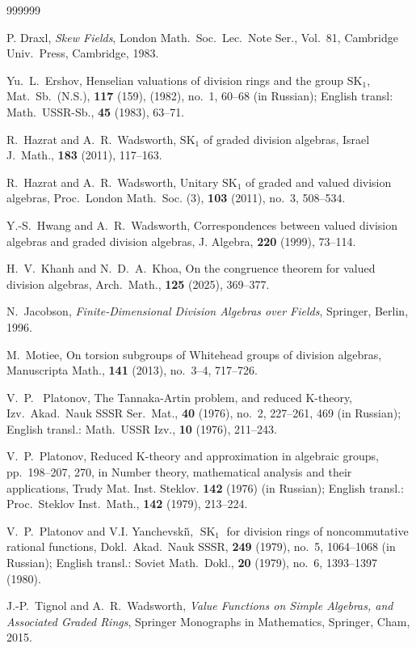 \documentclass[11pt]{article}
\numberwithin{equation}{section}
\theoremstyle{plain}
\theoremstyle{remark}
\newcommand{\opn}{\operatorname}
\newcommand{\SK}{\opn{SK_1}}
\begin{document}
\begin{thebibliography}{999999}

 P. Draxl, {\it{Skew Fields}}, London Math.~Soc.~Lec.~Note Ser., Vol.~81, 
Cambridge Univ.~Press, Cambridge, 1983.

 Yu.~L.~Ershov, Henselian valuations of division rings and the group $\SK$,
Mat.~Sb.~(N.S.), \textbf{117} (159),  (1982), no.~1, 60--68 (in Russian); English transl: Math.~USSR-Sb., 
\textbf{45} (1983), 63--71.


R.~Hazrat and A.~R.~Wadsworth, $\mathrm{SK}_1$ of graded division algebras, Israel J.~Math., \textbf{183} (2011), 117--163.

R.~Hazrat and A.~R.~Wadsworth, 
Unitary $\mathrm{SK}_1$ of graded and valued division algebras, 
Proc.~London Math.~Soc. (3), \textbf{103} (2011), no.~3, 508--534.

Y.-S.~Hwang and A.~R.~Wadsworth, Correspondences between valued division algebras and graded division algebras, J. Algebra, \textbf{220} (1999), 73--114.

H.~V.~Khanh and N.~D.~A.~Khoa,
On the congruence theorem for valued division algebras,
Arch.~Math., \textbf{125} (2025), 369--377.

N.~Jacobson, {\it{Finite-Dimensional Division Algebras over Fields}}, Springer, Berlin, 1996.

M.~Motiee,
On torsion subgroups of Whitehead groups of division algebras,
Manuscripta Math., \textbf{141} (2013), no.~3--4, 717--726.


V.~P.~ Platonov, The Tannaka-Artin problem, and reduced K-theory,   Izv.~Akad.~Nauk SSSR Ser.~Mat.,
\textbf{40} (1976), no.~2, 227--261, 469 (in Russian); English transl.:  Math.~USSR Izv., 
\textbf{10} (1976), 211--243.

V.~P.~Platonov, Reduced K-theory and approximation in algebraic groups, pp.~198--207, 270, in 
Number theory, mathematical analysis and their applications,
Trudy Mat. Inst. Steklov. \textbf{142} (1976) (in Russian); English transl.: Proc.~Steklov Inst.~Math., 
\textbf{142} (1979), 213--224. 


 V.~P.~Platonov and V.I. Yanchevski\v{\i}, $\opn{SK}_1$ for division rings of 
noncommutative rational functions,
Dokl.~Akad.~Nauk SSSR, \textbf{249} (1979), no.~5, 1064--1068 (in Russian); English transl.: Soviet Math.~Dokl.,
\textbf{20} (1979), no.~6, 1393--1397 (1980).

J.-P.~Tignol and A.~R.~Wadsworth,
\emph{Value Functions on Simple Algebras, and Associated Graded Rings},
Springer Monographs in Mathematics, Springer, Cham, 2015.


\end{thebibliography}
\end{document}

